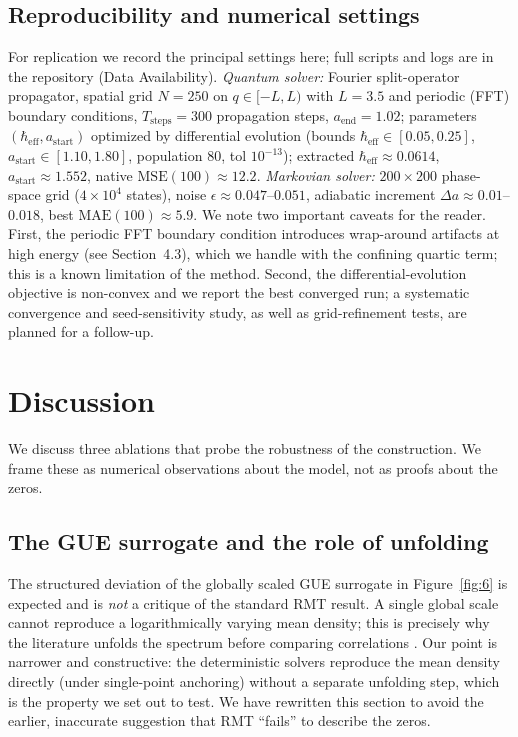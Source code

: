 \documentclass[11pt]{article}
\begin{document}
\subsection{Reproducibility and numerical settings}

For replication we record the principal settings here; full scripts and logs are in the repository (Data Availability). \emph{Quantum solver:} Fourier split-operator propagator, spatial grid $N=250$ on $q\in[-L,L)$ with $L=3.5$ and periodic (FFT) boundary conditions, $T_{\mathrm{steps}}=300$ propagation steps, $a_{\mathrm{end}}=1.02$; parameters $(\hbar_{\mathrm{eff}},a_{\mathrm{start}})$ optimized by differential evolution (bounds $\hbar_{\mathrm{eff}}\in[0.05,0.25]$, $a_{\mathrm{start}}\in[1.10,1.80]$, population $80$, tol $10^{-13}$); extracted $\hbar_{\mathrm{eff}}\approx0.0614$, $a_{\mathrm{start}}\approx1.552$, native $\mathrm{MSE}(100)\approx12.2$. \emph{Markovian solver:} $200\times200$ phase-space grid ($4\times10^4$ states), noise $\epsilon\approx0.047$--$0.051$, adiabatic increment $\Delta a\approx0.01$--$0.018$, best $\mathrm{MAE}(100)\approx5.9$. We note two important caveats for the reader. First, the periodic FFT boundary condition introduces wrap-around artifacts at high energy (see Section~4.3), which we handle with the confining quartic term; this is a known limitation of the method. Second, the differential-evolution objective is non-convex and we report the best converged run; a systematic convergence and seed-sensitivity study, as well as grid-refinement tests, are planned for a follow-up.

\section{Discussion}

We discuss three ablations that probe the robustness of the construction. We frame these as numerical observations about the model, not as proofs about the zeros.

\subsection{The GUE surrogate and the role of unfolding}

The structured deviation of the globally scaled GUE surrogate in Figure~\ref{fig:6} is expected and is \emph{not} a critique of the standard RMT result. A single global scale cannot reproduce a logarithmically varying mean density; this is precisely why the literature unfolds the spectrum before comparing correlations \cite{montgomery1973,odlyzko1987}. Our point is narrower and constructive: the deterministic solvers reproduce the mean density directly (under single-point anchoring) without a separate unfolding step, which is the property we set out to test. We have rewritten this section to avoid the earlier, inaccurate suggestion that RMT ``fails'' to describe the zeros.
\end{document}
